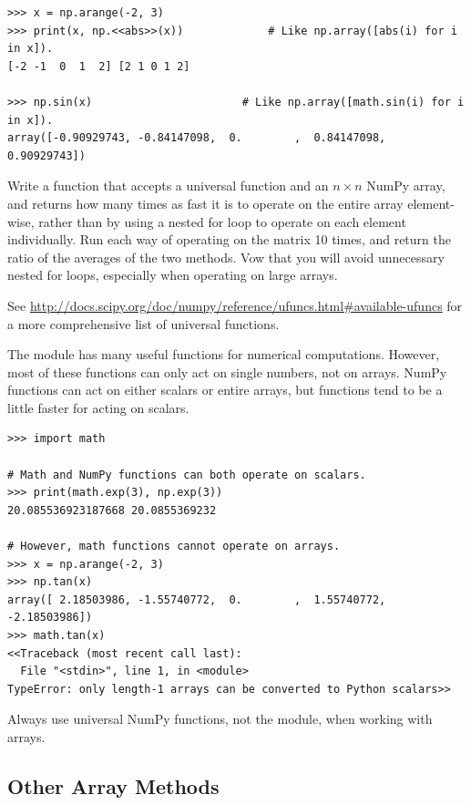 \begin{lstlisting}
>>> x = np.arange(-2, 3)
>>> print(x, np.<<abs>>(x))             # Like np.array([abs(i) for i in x]).
[-2 -1  0  1  2] [2 1 0 1 2]

>>> np.sin(x)                       # Like np.array([math.sin(i) for i in x]).
array([-0.90929743, -0.84147098,  0.        ,  0.84147098,  0.90929743])
\end{lstlisting}

\begin{problem}
Write a function that accepts a universal function and an $n\times n$ NumPy array, and returns how many times as fast it is to operate on the entire array element-wise, rather than by using a nested for loop to operate on each element individually.
Run each way of operating on the matrix 10 times, and return the ratio of the averages of the two methods.
Vow that you will avoid unnecessary nested for loops, especially when operating on large arrays.
\end{problem}

See \url{http://docs.scipy.org/doc/numpy/reference/ufuncs.html#available-ufuncs} for a more comprehensive list of universal functions.

\begin{warn}
The  module has many useful functions for numerical computations.
However, most of these functions can only act on single numbers, not on arrays.
NumPy functions can act on either scalars or entire arrays, but  functions tend to be a little faster for acting on scalars.
\begin{lstlisting}
>>> import math

# Math and NumPy functions can both operate on scalars.
>>> print(math.exp(3), np.exp(3))
20.085536923187668 20.0855369232

# However, math functions cannot operate on arrays.
>>> x = np.arange(-2, 3)
>>> np.tan(x)
array([ 2.18503986, -1.55740772,  0.        ,  1.55740772, -2.18503986])
>>> math.tan(x)
<<Traceback (most recent call last):
  File "<stdin>", line 1, in <module>
TypeError: only length-1 arrays can be converted to Python scalars>>
\end{lstlisting}
Always use universal NumPy functions, not the  module, when working with arrays.
\end{warn}

\subsection*{Other Array Methods} %

